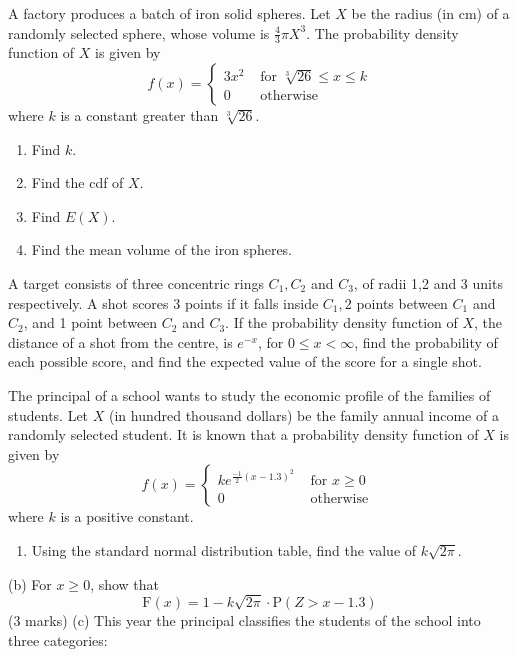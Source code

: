 \documentclass[letterpaper,10pt,addpoints]{exam}
\begin{document}


\newpage
\begin{questions}
  \question
  A factory produces a batch of iron solid spheres. Let $X$ be the radius (in $\mathrm{cm}$) of a randomly selected sphere, whose volume is $\frac{4}{3} \pi X^3$. The probability density function of $X$ is given by
  $$
  f(x)=\left\{\begin{array}{cl}
  3 x^2 & \text { for } \sqrt[3]{26} \leq x \leq k \\
  0 & \text { otherwise }
  \end{array}\right.
  $$
  where $k$ is a constant greater than $\sqrt[3]{26}$.
  \begin{enumerate}
    \item Find $k$.
    \item Find the cdf of $X$.
    \item Find $E(X)$.
    \item Find the mean volume of the iron spheres.
  \end{enumerate}

\question
A target consists of three concentric rings $C_1, C_2$ and $C_3$, of radii 1,2 and 3 units respectively. A shot scores 3 points if it falls inside $C_1, 2$ points between $C_1$ and $C_2$, and 1 point between $C_2$ and $C_3$. If the probability density function of $X$, the distance of a shot from the centre, is $e^{-x}$, for $0\le x < \infty$, find the probability of each possible score, and find the expected value of the score for a single shot.

\question
The principal of a school wants to study the economic profile of the families of students. Let $X$ (in hundred thousand dollars) be the family annual income of a randomly selected student. It is known that a probability density function of $X$ is given by
$$
f(x)=\left\{\begin{array}{cc}
k e^{\frac{-1}{2}(x-1.3)^2} & \text { for } x \geq 0 \\
0 & \text { otherwise }
\end{array}\right.
$$
where $k$ is a positive constant.
\begin{enumerate}
  \item Using the standard normal distribution table, find the value of $k \sqrt{2 \pi}$.
\end{enumerate}
(b) For $x \geq 0$, show that
$$
\mathrm{F}(x)=1-k \sqrt{2 \pi} \cdot \mathrm{P}(Z>x-1.3)
$$
(3 marks)
(c) This year the principal classifies the students of the school into three categories:



\end{questions}
\end{document}
